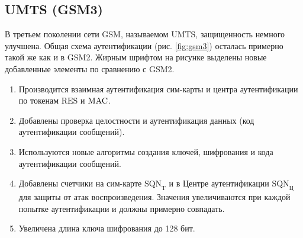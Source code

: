 ﻿\subsection{UMTS (GSM3)}

В третьем поколении сети GSM, называемом UMTS, защищенность немного улучшена. Общая схема аутентификации (рис. \ref{fig:gsm3}) осталась примерно такой же как и в GSM2. Жирным шрифтом на рисунке выделены новые добавленные элементы по сравнению с GSM2.
\begin{enumerate}
    \item Производится взаимная аутентификация сим-карты и центра аутентификации по токенам $\textrm{RES}$ и $\textrm{MAC}$.
    \item Добавлены проверка целостности и аутентификация данных (код аутентификации сообщений).
    \item Используются новые алгоритмы создания ключей, шифрования и кода аутентификации сообщений.
    \item Добавлены счетчики на сим-карте $\textrm{SQN}_\textrm{T}$ и в Центре аутентификации $\textrm{SQN}_\textrm{Ц}$ для защиты от атак воспроизведения. Значения увеличиваются при каждой попытке аутентификации и должны примерно совпадать.
    \item Увеличена длина ключа шифрования до 128 бит.
\end{enumerate}

